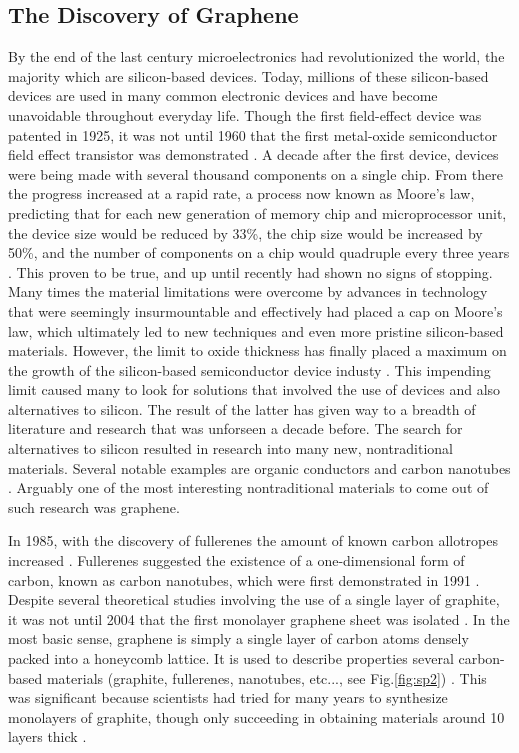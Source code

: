 \documentclass[%
 reprint,
 amsmath,amssymb,
 aps,
pra,
]{revtex4-1}
\begin{document}
\subsection{\label{subsec:discovery} The Discovery of Graphene}
By the end of the last century microelectronics had revolutionized the world, the majority which are silicon-based devices. Today, millions of these silicon-based devices are used in many common electronic devices and have become unavoidable throughout everyday life. Though the first field-effect device was patented in 1925, it was not until 1960 that the first metal-oxide semiconductor field effect transistor was demonstrated \cite{Lilienfeld1925, Atalla1960, Schulz1999}. A decade after the first device, devices were being made with several thousand components on a single chip. From there the progress increased at a rapid rate, a process now known as Moore's law, predicting that for each new generation of memory chip and microprocessor unit, the device size would be reduced by 33\%, the chip size would be increased by 50\%, and the number of components on a chip would quadruple every three years \cite{Schulz1999, Moore1965}. This proven to be true, and up until recently had shown no signs of stopping. Many times the material limitations were overcome by advances in technology that were seemingly insurmountable and effectively had placed a cap on Moore's law, which ultimately led to new techniques and even more pristine silicon-based materials. However, the limit to oxide thickness has finally placed a maximum on the growth of the silicon-based semiconductor device industy \cite{Schulz1999}. This impending limit caused many to look for solutions that involved the use of  devices and also alternatives to silicon. The result of the latter has given way to a breadth of literature and research that was unforseen a decade before. The search for alternatives to silicon resulted in research into many new, nontraditional materials. Several notable examples are organic conductors and carbon nanotubes \cite{Mascaro2001, Baughman2002}. Arguably one of the most interesting nontraditional materials to come out of such research was graphene. 

In 1985, with the discovery of fullerenes the amount of known carbon allotropes increased \cite{krotoFullerenes1985, nanoscaleReview2011}. Fullerenes suggested the existence of a one-dimensional form of carbon, known as carbon nanotubes, which were first demonstrated in 1991 \cite{iijimaCarbonNanotubes1991}. Despite several theoretical studies involving the use of a single layer of graphite, it was not until 2004 that the first monolayer graphene sheet was isolated \cite{novoselovEtAl2004, novoselovEtAl2005}. In the most basic sense, graphene is simply a single layer of carbon atoms densely packed into a honeycomb lattice. It is used to describe properties several carbon-based materials (graphite, fullerenes, nanotubes, etc..., see Fig.\ref{fig:sp2}) \cite{Dresselhaus2002, Brenner2002, novoselovEtAl2004}. This was significant because scientists had tried for many years to synthesize monolayers of graphite, though only succeeding in obtaining materials around 10 layers thick \cite{nanoscaleReview2011}.
\end{document}
